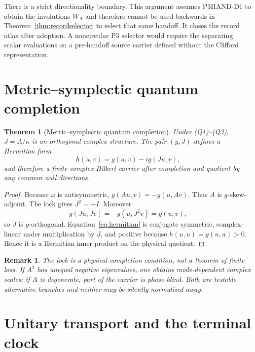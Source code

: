 \documentclass[11pt]{article}
\newtheorem{theorem}{Theorem}
\newtheorem{remark}{Remark}
\begin{document}
There is a strict directionality boundary. This argument assumes P3HAND-D1
to obtain the involutions $W_A$ and therefore cannot be used backwards in
Theorem~\ref{thm:recordselector} to select that same handoff. It closes the
record atlas after adoption. A noncircular P3 selector would require the
separating scalar evaluations on a pre-handoff source carrier defined without
the Clifford representation.

\section{Metric--symplectic quantum completion}

\begin{theorem}[Metric--symplectic quantum completion]
\label{thm:complex}
Under (Q1)--(Q3), $J=A/\kappa$ is an orthogonal complex structure.  The pair
$(g,J)$ defines a Hermitian form
\begin{equation}
 h(u,v)=g(u,v)-i g(Ju,v),
 \label{eq:hermitian}
\end{equation}
and therefore a finite complex Hilbert carrier after completion and quotient
by any common null directions.
\end{theorem}

\begin{proof}
Because $\omega$ is antisymmetric,
$g(Au,v)=-g(u,Av)$.  Thus $A$ is $g$-skew-adjoint.  The lock gives
$J^2=-I$.  Moreover
\begin{equation}
 g(Ju,Jv)=-g(u,J^2v)=g(u,v),
\end{equation}
so $J$ is $g$-orthogonal.  Equation~\eqref{eq:hermitian} is conjugate
symmetric, complex-linear under multiplication by $J$, and positive because
$h(u,u)=g(u,u)>0$.  Hence it is a Hermitian inner product on the physical
quotient.
\end{proof}

\begin{remark}
The lock is a physical completion condition, not a theorem of finite loss.
If $A^2$ has unequal negative eigenvalues, one obtains mode-dependent complex
scales; if $A$ is degenerate, part of the carrier is phase-blind.  Both are
testable alternative branches and neither may be silently normalized away.
\end{remark}

\section{Unitary transport and the terminal clock}
\end{document}

